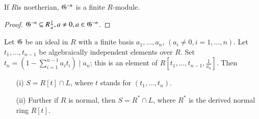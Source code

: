 \begin{rem}%
  If $R$\pageoriginale is noetherian, $\mathfrak{G}^{-n}$ is a finite
  $R$-module.  
\end{rem}

\begin{proof}
  $\mathfrak{G}^{-n}\subseteq R \frac{1}{a}, a \ne 0, a \in \mathfrak{G}^{-n}$. 
\end{proof} 

\setcounter{proposition}{0}
\begin{proposition}\label{chap5:prop1}%
  Let $\mathfrak{G}$ be an ideal in $R$ with a finite basis  
  $a_1 , \ldots , a_n$, $(a_i \ne 0, i = 1 , \ldots , n)$. Let $t_1,
  \ldots, t_{n-1}$ be algebraically independent elements over
  $R$. Set $t_n = (1 -  \sum\limits_{i=1}^{n-1} a_i t_i ) \mid a_n$;
  this is an element of $R[t_1, \ldots, t_{n-1},
    \frac{1}{a_n}]$. Then  
 \begin{itemize}
\item[{\rm (i)}] $S = R [t]\cap L$, where $t$ stands for $(t_1 ,
  \ldots , t_n)$. 

\item[{\rm (ii)}] Further if $R$ is normal, then $S = R^* \cap L$,
  where $R^*$ is the derived normal ring $R[t]$.   
 \end{itemize}
\end{proposition}

